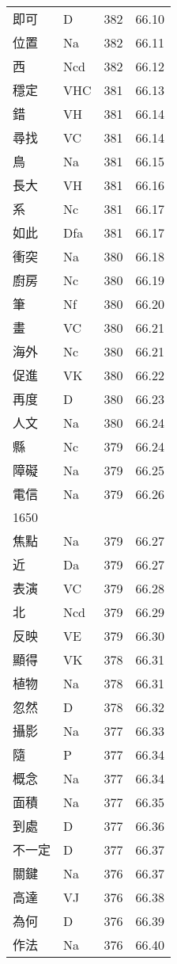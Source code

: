 \documentclass[twocolumn]{book}
\begin{document}
\begin{supertabular}{llrr}
即可 & D & 382 &  66.10\\
位置 & Na & 382 &  66.11\\
西 & Ncd & 382 &  66.12\\
穩定 & VHC & 381 &  66.13\\
錯 & VH & 381 &  66.14\\
尋找 & VC & 381 &  66.14\\
鳥 & Na & 381 &  66.15\\
長大 & VH & 381 &  66.16\\
系 & Nc & 381 &  66.17\\
如此 & Dfa & 381 &  66.17\\
衝突 & Na & 380 &  66.18\\
廚房 & Nc & 380 &  66.19\\
筆 & Nf & 380 &  66.20\\
畫 & VC & 380 &  66.21\\
海外 & Nc & 380 &  66.21\\
促進 & VK & 380 &  66.22\\
再度 & D & 380 &  66.23\\
人文 & Na & 380 &  66.24\\
縣 & Nc & 379 &  66.24\\
障礙 & Na & 379 &  66.25\\
電信 & Na & 379 &  66.26\\
1650\\
焦點 & Na & 379 &  66.27\\
近 & Da & 379 &  66.27\\
表演 & VC & 379 &  66.28\\
北 & Ncd & 379 &  66.29\\
反映 & VE & 379 &  66.30\\
顯得 & VK & 378 &  66.31\\
植物 & Na & 378 &  66.31\\
忽然 & D & 378 &  66.32\\
攝影 & Na & 377 &  66.33\\
隨 & P & 377 &  66.34\\
概念 & Na & 377 &  66.34\\
面積 & Na & 377 &  66.35\\
到處 & D & 377 &  66.36\\
不一定 & D & 377 &  66.37\\
關鍵 & Na & 376 &  66.37\\
高達 & VJ & 376 &  66.38\\
為何 & D & 376 &  66.39\\
作法 & Na & 376 &  66.40\\

\end{supertabular}
\end{document}
